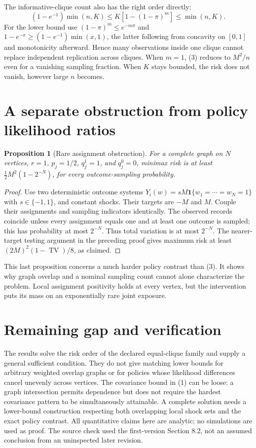 \documentclass[11pt]{article}
\newtheorem{proposition}[theorem]{Proposition}
\theoremstyle{remark}
\newcommand{\Ind}{\mathbf 1}
\newcommand{\TV}{\operatorname{TV}}
\begin{document}
The informative-clique count also has the right order directly:
\[
 (1-e^{-1})\min(n,K)\leq K[1-(1-\pi)^m]\leq\min(n,K).
\]
For the lower bound use $(1-\pi)^m\leq e^{-m\pi}$ and
$1-e^{-x}\geq(1-e^{-1})\min(x,1)$, the latter following from concavity
on $[0,1]$ and monotonicity afterward. Hence many observations inside
one clique cannot replace independent replication across cliques.
When $m=1$, (3) reduces to $M^2/n$ even for a vanishing sampling fraction.
When $K$ stays bounded, the risk does not vanish, however large $n$ becomes.

\section{A separate obstruction from policy likelihood ratios}
\begin{proposition}[Rare assignment obstruction]
For a complete graph on $N$ vertices, $r=1$, $p_j=1/2$,
$q^1_j=1$, and $q^0_j=0$, minimax risk is at least
$\tfrac12M^2(1-2^{-N})$, for every outcome-sampling probability.
\end{proposition}
\begin{proof}
Use two deterministic outcome systems
$Y_i(w)=sM\Ind\{w_1=\cdots=w_N=1\}$ with $s\in\{-1,1\}$,
and constant shocks. Their targets are $-M$ and $M$. Couple their
assignments and sampling indicators identically. The observed records
coincide unless every assignment equals one and at least one outcome is
sampled; this has probability at most $2^{-N}$. Thus total variation is
at most $2^{-N}$. The nearer-target testing argument in the preceding
proof gives maximum risk at least $(2M)^2(1-\TV)/8$, as claimed.
\end{proof}

This last proposition concerns a much harder policy contrast than (3).
It shows why graph overlap and a nominal sampling count cannot alone
characterize the problem. Local assignment positivity holds at every
vertex, but the intervention puts its mass on an exponentially rare
joint exposure.

\section{Remaining gap and verification}
The results solve the risk order of the declared equal-clique family and
supply a general sufficient condition. They do not give matching lower
bounds for arbitrary weighted overlap graphs or for policies whose
likelihood differences cancel unevenly across vertices. The covariance
bound in (1) can be loose: a graph intersection permits dependence but
does not require the hardest covariance pattern to be simultaneously
attainable. A complete solution needs a lower-bound construction respecting
both overlapping local shock sets and the exact policy contrast.
All quantitative claims here are analytic; no simulations are used as
proof. The source check used the first-version Section 8.2, not an assumed
conclusion from an uninspected later revision.
\end{document}
